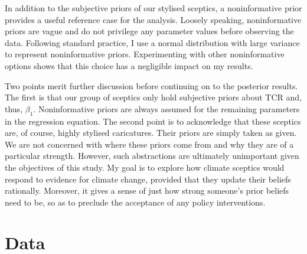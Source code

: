 \documentclass[smallextended]{svjour3}       %
\begin{document}
In addition to the subjective priors of our stylised sceptics, a
noninformative prior provides a useful reference case for the analysis.
Loosely speaking, noninformative priors are vague and do not privilege
any parameter values before observing the data. Following standard
practice, I use a normal distribution with large variance to represent
noninformative priors. Experimenting with other noninformative options
shows that this choice has a negligible impact on my results.

Two points merit further discussion before continuing on to the
posterior results. The first is that our group of sceptics only hold
subjective priors about TCR and, thus, \(\beta_1\). Noninformative
priors are always assumed for the remaining parameters in the regression
equation. The second point is to acknowledge that these sceptics are, of
course, highly stylised caricatures. Their priors are simply taken as
given. We are not concerned with where these priors come from and why
they are of a particular strength. However, such abstractions are
ultimately unimportant given the objectives of this study. My goal is to
explore how climate sceptics would respond to evidence for climate
change, provided that they update their beliefs rationally. Moreover, it
gives a sense of just how strong someone's prior beliefs need to be, so
as to preclude the acceptance of any policy interventions.

\hypertarget{sec:data}{%
\section{Data}\label{sec:data}}
\end{document}
